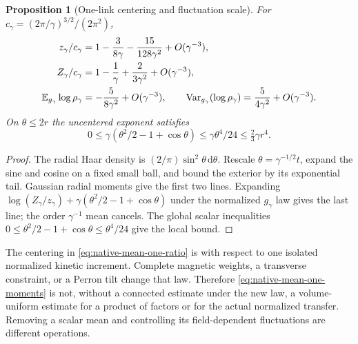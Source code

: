 \documentclass[11pt,oneside,openany]{book}
\newtheorem{proposition}[proposition]{Proposition}
\theoremstyle{definition}
\theoremstyle{remark}
\newcommand{\dd}{\mathrm d}
\begin{document}
\begin{proposition}[One-link centering and fluctuation scale]
\label{prop:native-mean-one}
For $c_\gamma=(2\pi/\gamma)^{3/2}/(2\pi^2)$,
\begin{align}
 z_\gamma/c_\gamma
   &=1-\frac{3}{8\gamma}-\frac{15}{128\gamma^2}
                                      +O(\gamma^{-3}),\notag\\
 Z_\gamma/c_\gamma
   &=1-\frac1\gamma+\frac{2}{3\gamma^2}
                                      +O(\gamma^{-3}),\notag\\
 \mathbb E_{g_\gamma}\log\rho_\gamma
   &=-\frac{5}{8\gamma^2}+O(\gamma^{-3}),\qquad
 \operatorname{Var}_{g_\gamma}(\log\rho_\gamma)
     =\frac{5}{4\gamma^2}+O(\gamma^{-3}).
 \label{eq:native-mean-one-moments}
\end{align}
On $\theta\le2r$ the uncentered exponent satisfies
\begin{equation}
 0\le\gamma(\theta^2/2-1+\cos\theta)
       \le\gamma\theta^4/24\le\tfrac23\gamma r^4.
 \label{eq:native-ratio-local-remainder}
\end{equation}
\end{proposition}
\begin{proof}
The radial Haar density is $(2/\pi)\sin^2\theta\,\dd\theta$.
Rescale $\theta=\gamma^{-1/2}t$, expand the sine and cosine on a fixed
small ball, and bound the exterior by its exponential tail. Gaussian
radial moments give the first two lines. Expanding
$\log(Z_\gamma/z_\gamma)+\gamma(\theta^2/2-1+\cos\theta)$ under
the normalized $g_\gamma$ law gives the last line; the order
$\gamma^{-1}$ mean cancels. The global scalar inequalities
$0\le\theta^2/2-1+\cos\theta\le\theta^4/24$ give the local bound.
\end{proof}

The centering in \cref{eq:native-mean-one-ratio} is with respect to
one isolated normalized kinetic increment. Complete magnetic weights,
a transverse constraint, or a Perron tilt change that law. Therefore
\cref{eq:native-mean-one-moments} is not, without a connected estimate
under the new law, a volume-uniform estimate for a product of factors
or for the actual normalized transfer. Removing a scalar mean and
controlling its field-dependent fluctuations are different operations.
\end{document}
